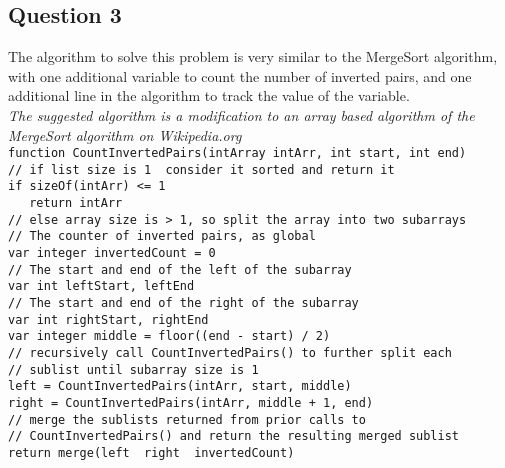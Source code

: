 \documentclass{article}
\begin{document}
\clearpage

\subsection*{Question 3}
The algorithm to solve this problem is very similar to the MergeSort algorithm,
with one additional variable to count the number of inverted pairs, and one
additional line in the algorithm to track the value of the variable.\\
\textit{The suggested algorithm is a modification to an array based algorithm
of the MergeSort algorithm on Wikipedia.org}\\

\vspace{0.5cm} \texttt{function CountInvertedPairs(intArray intArr, int
start, int end)}\\
\texttt{// if list size is 1\, consider it sorted and return it}\\
\texttt{if sizeOf(intArr) <= 1}\\
\texttt{$\quad$    return intArr}\\
\texttt{// else array size is > 1, so split the array into two subarrays}\\
\texttt{// The counter of inverted pairs, as global}\\
\texttt{var integer invertedCount = 0}\\
\texttt{// The start and end of the left of the subarray }\\
\texttt{var int leftStart, leftEnd }\\
\texttt{// The start and end of the right of the subarray }\\
\texttt{var int rightStart, rightEnd }\\
\texttt{var integer middle = floor((end - start) / 2)}\\
\texttt{// recursively call CountInvertedPairs() to further split each}\\
\texttt{// sublist until subarray size is 1}\\
\texttt{left = CountInvertedPairs(intArr, start, middle)}\\
\texttt{right = CountInvertedPairs(intArr, middle + 1, end)}\\
\texttt{// merge the sublists returned from prior calls to}\\
\texttt{// CountInvertedPairs() and return the resulting merged sublist}\\
\texttt{return merge(left\, right\, invertedCount)}\\
\end{document}
